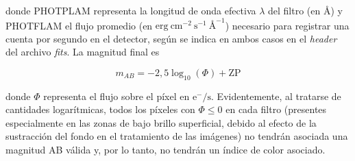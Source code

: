 donde PHOTPLAM representa la longitud de onda efectiva \(\lambda\) del filtro (en \AA) y PHOTFLAM el flujo promedio (en \(\text{erg}\: \text{cm}^{-2}\: \text{s}^{-1}\: \text{\AA}^{-1}\)) necesario para registrar una cuenta por segundo en el detector, según se indica en ambos casos en el \textit{header} del archivo \textit{fits}. La magnitud final es

\begin{equation}
    m_{AB} = - 2,5\log_{10}{(\Phi)} + \text{ZP}
\end{equation}

donde \(\Phi\) representa el flujo sobre el píxel en \(\text{e}^{-}/\text{s}\). Evidentemente, al tratarse de cantidades logarítmicas, todos los píxeles con \(\Phi \leq 0\) en cada filtro (presentes especialmente en las zonas de bajo brillo superficial, debido al efecto de la sustracción del fondo en el tratamiento de las imágenes) no tendrán asociada una magnitud AB válida y, por lo tanto, no tendrán un índice de color asociado. \par

